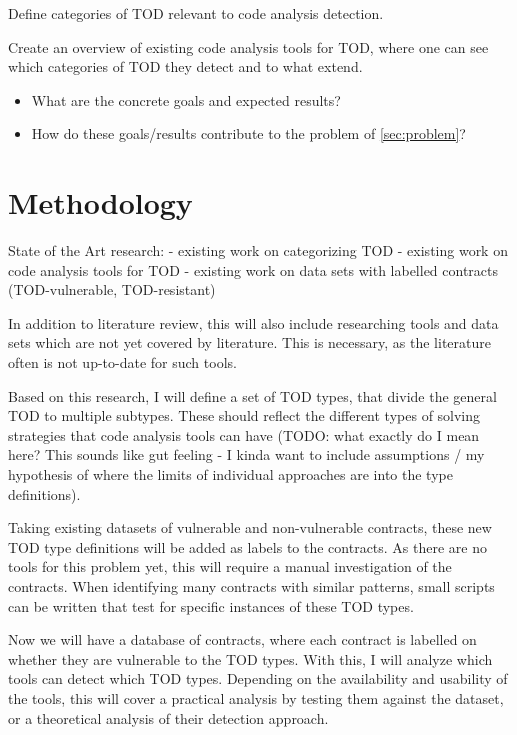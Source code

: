 \documentclass[paper=a4,fontsize=11pt,oneside,titlepage]{scrartcl}
\begin{document}
Define categories of TOD relevant to code analysis detection.

Create an overview of existing code analysis tools for TOD, where one can see which categories of TOD they detect and to what extend.

\begin{itemize}
\item What are the concrete goals and expected results?
\item How do these goals/results contribute to the problem of \autoref{sec:problem}?
\end{itemize}

\section{Methodology}
\label{sec:methods}

State of the Art research:
- existing work on categorizing TOD
- existing work on code analysis tools for TOD
- existing work on data sets with labelled contracts (TOD-vulnerable, TOD-resistant)

In addition to literature review, this will also include researching tools and data sets which are not yet covered by literature. This is necessary, as the literature often is not up-to-date for such tools.

Based on this research, I will define a set of TOD types, that divide the general TOD to multiple subtypes. These should reflect the different types of solving strategies that code analysis tools can have (TODO: what exactly do I mean here? This sounds like gut feeling - I kinda want to include assumptions / my hypothesis of where the limits of individual approaches are into the type definitions).

Taking existing datasets of vulnerable and non-vulnerable contracts, these new TOD type definitions will be added as labels to the contracts. As there are no tools for this problem yet, this will require a manual investigation of the contracts. When identifying many contracts with similar patterns, small scripts can be written that test for specific instances of these TOD types.

Now we will have a database of contracts, where each contract is labelled on whether they are vulnerable to the TOD types. With this, I will analyze which tools can detect which TOD types. Depending on the availability and usability of the tools, this will cover a practical analysis by testing them against the dataset, or a theoretical analysis of their detection approach.
\end{document}

